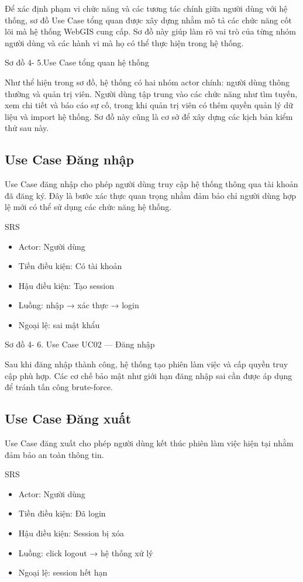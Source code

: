 \documentclass[13pt,a4paper]{report}
\begin{document}
Để xác định phạm vi chức năng và các tương tác chính giữa người dùng với hệ thống, sơ đồ Use Case tổng quan được xây dựng nhằm mô tả các chức năng cốt lõi mà hệ thống WebGIS cung cấp. Sơ đồ này giúp làm rõ vai trò của từng nhóm người dùng và các hành vi mà họ có thể thực hiện trong hệ thống.

Sơ đồ 4- 5.Use Case tổng quan hệ thống

Như thể hiện trong sơ đồ, hệ thống có hai nhóm actor chính: người dùng thông thường và quản trị viên. Người dùng tập trung vào các chức năng như tìm tuyến, xem chi tiết và báo cáo sự cố, trong khi quản trị viên có thêm quyền quản lý dữ liệu và import hệ thống. Sơ đồ này cũng là cơ sở để xây dựng các kịch bản kiểm thử sau này.

\subsection{Use Case Đăng nhập}

Use Case đăng nhập cho phép người dùng truy cập hệ thống thông qua tài khoản đã đăng ký. Đây là bước xác thực quan trọng nhằm đảm bảo chỉ người dùng hợp lệ mới có thể sử dụng các chức năng hệ thống.

SRS

\begin{itemize}
    \item Actor: Người dùng
    \item Tiền điều kiện: Có tài khoản
    \item Hậu điều kiện: Tạo session
    \item Luồng: nhập → xác thực → login
    \item Ngoại lệ: sai mật khẩu
\end{itemize}

Sơ đồ 4- 6. Use Case UC02 — Đăng nhập

Sau khi đăng nhập thành công, hệ thống tạo phiên làm việc và cấp quyền truy cập phù hợp. Các cơ chế bảo mật như giới hạn đăng nhập sai cần được áp dụng để tránh tấn công brute-force.

\subsection{Use Case Đăng xuất}

Use Case đăng xuất cho phép người dùng kết thúc phiên làm việc hiện tại nhằm đảm bảo an toàn thông tin.

SRS

\begin{itemize}
    \item Actor: Người dùng
    \item Tiền điều kiện: Đã login
    \item Hậu điều kiện: Session bị xóa
    \item Luồng: click logout → hệ thống xử lý
    \item Ngoại lệ: session hết hạn
\end{itemize}
\end{document}
